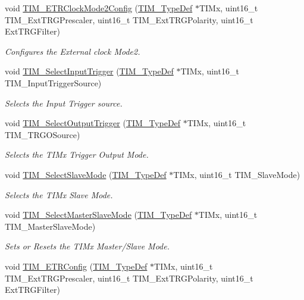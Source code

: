 \begin{DoxyCompactItemize}
void \hyperlink{group___t_i_m_ga0a9cbcbab32326cbbdaf4c111f59ec20}{T\+I\+M\+\_\+\+E\+T\+R\+Clock\+Mode2\+Config} (\hyperlink{struct_t_i_m___type_def}{T\+I\+M\+\_\+\+Type\+Def} $\ast$T\+I\+Mx, uint16\+\_\+t T\+I\+M\+\_\+\+Ext\+T\+R\+G\+Prescaler, uint16\+\_\+t T\+I\+M\+\_\+\+Ext\+T\+R\+G\+Polarity, uint16\+\_\+t Ext\+T\+R\+G\+Filter)
\begin{DoxyCompactList}\small\item\em Configures the External clock Mode2. \end{DoxyCompactList}\item 
void \hyperlink{group___t_i_m_ga4252583c6ae8a73d6fc66f7e951dbc35}{T\+I\+M\+\_\+\+Select\+Input\+Trigger} (\hyperlink{struct_t_i_m___type_def}{T\+I\+M\+\_\+\+Type\+Def} $\ast$T\+I\+Mx, uint16\+\_\+t T\+I\+M\+\_\+\+Input\+Trigger\+Source)
\begin{DoxyCompactList}\small\item\em Selects the Input Trigger source. \end{DoxyCompactList}\item 
void \hyperlink{group___t_i_m_ga28745aaa549e2067e42c19569209e6c6}{T\+I\+M\+\_\+\+Select\+Output\+Trigger} (\hyperlink{struct_t_i_m___type_def}{T\+I\+M\+\_\+\+Type\+Def} $\ast$T\+I\+Mx, uint16\+\_\+t T\+I\+M\+\_\+\+T\+R\+G\+O\+Source)
\begin{DoxyCompactList}\small\item\em Selects the T\+I\+Mx Trigger Output Mode. \end{DoxyCompactList}\item 
void \hyperlink{group___t_i_m_ga2f19ce1d90990691cf037e419ba08003}{T\+I\+M\+\_\+\+Select\+Slave\+Mode} (\hyperlink{struct_t_i_m___type_def}{T\+I\+M\+\_\+\+Type\+Def} $\ast$T\+I\+Mx, uint16\+\_\+t T\+I\+M\+\_\+\+Slave\+Mode)
\begin{DoxyCompactList}\small\item\em Selects the T\+I\+Mx Slave Mode. \end{DoxyCompactList}\item 
void \hyperlink{group___t_i_m_ga4dcc3d11b670c381d0ff9cb7e9fd01e2}{T\+I\+M\+\_\+\+Select\+Master\+Slave\+Mode} (\hyperlink{struct_t_i_m___type_def}{T\+I\+M\+\_\+\+Type\+Def} $\ast$T\+I\+Mx, uint16\+\_\+t T\+I\+M\+\_\+\+Master\+Slave\+Mode)
\begin{DoxyCompactList}\small\item\em Sets or Resets the T\+I\+Mx Master/\+Slave Mode. \end{DoxyCompactList}\item 
void \hyperlink{group___t_i_m_ga8bdde400b7a30f3e747fe8e4962c0abe}{T\+I\+M\+\_\+\+E\+T\+R\+Config} (\hyperlink{struct_t_i_m___type_def}{T\+I\+M\+\_\+\+Type\+Def} $\ast$T\+I\+Mx, uint16\+\_\+t T\+I\+M\+\_\+\+Ext\+T\+R\+G\+Prescaler, uint16\+\_\+t T\+I\+M\+\_\+\+Ext\+T\+R\+G\+Polarity, uint16\+\_\+t Ext\+T\+R\+G\+Filter)

\end{DoxyCompactItemize}
